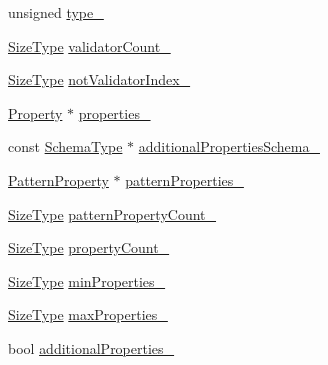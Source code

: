 \begin{DoxyCompactItemize}
\item 
unsigned \mbox{\hyperlink{classrapidjson_1_1internal_1_1_schema_a83c8784d380200d1576a1881c5532b16}{type\+\_\+}}
\item 
\mbox{\hyperlink{namespacerapidjson_a44eb33eaa523e36d466b1ced64b85c84}{Size\+Type}} \mbox{\hyperlink{classrapidjson_1_1internal_1_1_schema_ad1499617f1d88331e63111647be2c767}{validator\+Count\+\_\+}}
\item 
\mbox{\hyperlink{namespacerapidjson_a44eb33eaa523e36d466b1ced64b85c84}{Size\+Type}} \mbox{\hyperlink{classrapidjson_1_1internal_1_1_schema_a866ce47f9def005ed45f8f19736cbba2}{not\+Validator\+Index\+\_\+}}
\item 
\mbox{\hyperlink{structrapidjson_1_1internal_1_1_schema_1_1_property}{Property}} $\ast$ \mbox{\hyperlink{classrapidjson_1_1internal_1_1_schema_aa2a4a4d8e178fba11d251cf1a5556764}{properties\+\_\+}}
\item 
const \mbox{\hyperlink{classrapidjson_1_1internal_1_1_schema_a62e03be17971648a9d614244ffcb0f10}{Schema\+Type}} $\ast$ \mbox{\hyperlink{classrapidjson_1_1internal_1_1_schema_ad0201b6b0702bb8c8f4f860242c84f4b}{additional\+Properties\+Schema\+\_\+}}
\item 
\mbox{\hyperlink{structrapidjson_1_1internal_1_1_schema_1_1_pattern_property}{Pattern\+Property}} $\ast$ \mbox{\hyperlink{classrapidjson_1_1internal_1_1_schema_afbfcc72fa7ff7e3a9ae8f0f43d58aca5}{pattern\+Properties\+\_\+}}
\item 
\mbox{\hyperlink{namespacerapidjson_a44eb33eaa523e36d466b1ced64b85c84}{Size\+Type}} \mbox{\hyperlink{classrapidjson_1_1internal_1_1_schema_af787b1cdb7ad344be3d6944782771cce}{pattern\+Property\+Count\+\_\+}}
\item 
\mbox{\hyperlink{namespacerapidjson_a44eb33eaa523e36d466b1ced64b85c84}{Size\+Type}} \mbox{\hyperlink{classrapidjson_1_1internal_1_1_schema_a9f6ce8607cea323c9b63669b02308262}{property\+Count\+\_\+}}
\item 
\mbox{\hyperlink{namespacerapidjson_a44eb33eaa523e36d466b1ced64b85c84}{Size\+Type}} \mbox{\hyperlink{classrapidjson_1_1internal_1_1_schema_af49c1b94488c5287e8f60b80836171df}{min\+Properties\+\_\+}}
\item 
\mbox{\hyperlink{namespacerapidjson_a44eb33eaa523e36d466b1ced64b85c84}{Size\+Type}} \mbox{\hyperlink{classrapidjson_1_1internal_1_1_schema_a86733f5bb07719135de58365a50c58ae}{max\+Properties\+\_\+}}
\item 
bool \mbox{\hyperlink{classrapidjson_1_1internal_1_1_schema_a87dc9148ab471bd259c0983abdb5eaad}{additional\+Properties\+\_\+}}

\end{DoxyCompactItemize}
